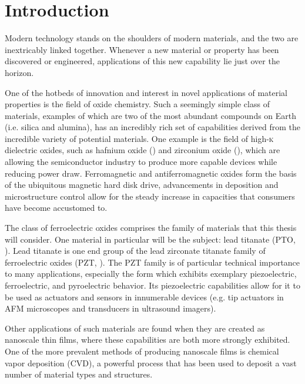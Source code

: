 \chapter{Introduction}
\label{ch:Intro}
\thispagestyle{empty}



Modern technology stands on the shoulders of modern materials, and the two are inextricably linked together. Whenever a new material or property has been discovered or engineered, applications of this new capability lie just over the horizon. 

One of the hotbeds of innovation and interest in novel applications of material properties is the field of oxide chemistry. Such a seemingly simple class of materials, examples of which are two of the most abundant compounds on Earth (i.e. silica and alumina), has an incredibly rich set of capabilities derived from the incredible variety of potential materials. One example is the field of high-\textsc{k} dielectric oxides, such as hafnium oxide () and zirconium oxide (), which are allowing the semiconductor industry to produce more capable devices while reducing power draw. Ferromagnetic and antiferromagnetic oxides form the basis of the ubiquitous magnetic hard disk drive, advancements in deposition and microstructure control allow for the steady increase in capacities that consumers have become accustomed to. 

The class of ferroelectric oxides comprises the family of materials that this thesis will consider. One material in particular will be the subject: lead titanate (PTO, \PTO{}). Lead titanate is one end group of the lead zirconate titanate family of ferroelectric oxides (PZT, ). The PZT family is of particular technical importance to many applications, especially the  form which exhibits exemplary piezoelectric, ferroelectric, and pyroelectric behavior. Its piezoelectric capabilities allow for it to be used as actuators and sensors in innumerable devices (e.g. tip actuators in AFM microscopes and transducers in ultrasound imagers). 

Other applications of such materials are found when they are created as nanoscale thin films, where these capabilities are both more strongly exhibited. One of the more prevalent methods of producing nanoscale films is chemical vapor deposition (CVD), a powerful process that has been used to deposit a vast number of material types and structures. 

